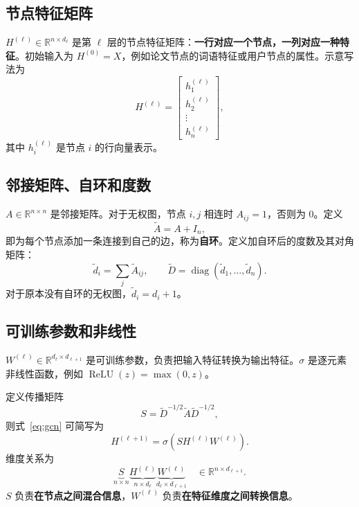 \documentclass[UTF8,a4paper,11pt,fontset=fandol]{ctexart}
\begin{document}
\subsection{节点特征矩阵}
$H^{(\ell)}\in\mathbb R^{n\times d_\ell}$ 是第 $\ell$ 层的节点特征矩阵：\textbf{一行对应一个节点，一列对应一种特征}。初始输入为 $H^{(0)}=X$，例如论文节点的词语特征或用户节点的属性。示意写法为
\begin{equation}
H^{(\ell)}=
\begin{bmatrix}
h_1^{(\ell)}\\h_2^{(\ell)}\\\vdots\\h_n^{(\ell)}
\end{bmatrix},
\end{equation}
其中 $h_i^{(\ell)}$ 是节点 $i$ 的行向量表示。

\subsection{邻接矩阵、自环和度数}
$A\in\mathbb R^{n\times n}$ 是邻接矩阵。对于无权图，节点 $i,j$ 相连时 $A_{ij}=1$，否则为 $0$。定义
\begin{equation}
\widetilde A=A+I_n,
\end{equation}
即为每个节点添加一条连接到自己的边，称为\textbf{自环}。定义加自环后的度数及其对角矩阵：
\begin{equation}
\widetilde d_i=\sum_j\widetilde A_{ij},\qquad
\widetilde D=\operatorname{diag}(\widetilde d_1,\ldots,\widetilde d_n).
\end{equation}
对于原本没有自环的无权图，$\widetilde d_i=d_i+1$。

\subsection{可训练参数和非线性}
$W^{(\ell)}\in\mathbb R^{d_\ell\times d_{\ell+1}}$ 是可训练参数，负责把输入特征转换为输出特征。$\sigma$ 是逐元素非线性函数，例如 $\operatorname{ReLU}(z)=\max(0,z)$。

定义传播矩阵
\begin{equation}
S=\widetilde D^{-1/2}\widetilde A\widetilde D^{-1/2},
\label{eq:S}
\end{equation}
则式~\eqref{eq:gcn} 可简写为
\begin{equation}
H^{(\ell+1)}=\sigma\!\left(SH^{(\ell)}W^{(\ell)}\right).
\end{equation}
维度关系为
\begin{equation}
\underbrace{S}_{n\times n}
\underbrace{H^{(\ell)}}_{n\times d_\ell}
\underbrace{W^{(\ell)}}_{d_\ell\times d_{\ell+1}}
\quad\in\mathbb R^{n\times d_{\ell+1}}.
\end{equation}
$S$ 负责\textbf{在节点之间混合信息}，$W^{(\ell)}$ 负责\textbf{在特征维度之间转换信息}。
\end{document}
